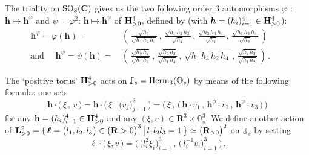 \documentclass[11pt]{amsart}
\newcommand{\sk}{\smallskip}
\begin{document}
The triality on  ${\rm SO}_8(\mathbf C)$ gives us the two following order 3 automorphisms 
  $\varphi $ : $\boldsymbol{h}\mapsto \boldsymbol{h}^\varphi $ 
and $\psi=\varphi^2$: $\boldsymbol{h}\mapsto \boldsymbol{h}^\psi $
of ${\bf H}^4_{>0}$, defined by  (with $\boldsymbol{h}=(h_i)_{i=1}^4 \in {\bf H}^4_{>0}$): 
\begin{align*}
\boldsymbol{h}^\varphi=\varphi(\boldsymbol{h})=  & \, 
\left(\,
\frac{\sqrt{h_{3}}}{\sqrt{h_{1}\,h_{2}\,h_{4}}}
\, , \,  
\frac{\sqrt{h_{1}\,h_{2}\,h_{3}}}{\sqrt{h_{4}}}
\, , \,  
\frac{\sqrt{h_{2}\,h_{3}\,h_{4}}}{\sqrt{h_{1}}}
\, , \,  
\frac{\sqrt{h_{1}\,h_{3}\,h_{4}}}{\sqrt{h_{2}}}
\, 
\right)\qquad \\
\mbox{and }\quad 
\boldsymbol{h}^\psi=\psi(\boldsymbol{h}) = &\,  
\left(\, \frac{\sqrt{h_{2}\,h_{4}}}{\sqrt{h_{1}\,h_{3}}}
\, , \,  
 \frac{\sqrt{h_{2}\, h_{3}}}{\sqrt{h_{1}\, h_{4}}}
 \, , \,  
\sqrt{h_{1}\, h_{3}\, h_{2}\, h_{4}}
\, , \,  
\frac{\sqrt{h_{4}\, h_{3}}}{\sqrt{h_{1}\, h_{2}}}\, \right)\, . 
\end{align*}
\sk


The `positive torus' ${\bf H}^4_{>0}$ acts on $\mathbb J_s= {\rm Herm}_3(\mathbb O_s)$ by means of the following formula:  one sets 
\begin{equation}%
\label{Eq:H4-action}
\boldsymbol{h}\cdot \big(\, \xi\, ,\, v\,\big)= 
\boldsymbol{h}\cdot \Big(\, 
\xi\, , \, 
\big(v_j\big)_{j=1}^3\,
\Big)= \Big(\, 
\xi\, , \, 
\big(\, \boldsymbol{h}\cdot v_1\, , \, 
\boldsymbol{h}^\phi\cdot v_2
\, , \, 
\boldsymbol{h}^\psi\cdot v_3\, 
\big)\,
\Big)
\end{equation}%
for any ${\bf h}=(h_i)_{i=1}^4\in {\bf H}^4_{>0}$
and any $(\xi,v)\in \mathbf R^3\times \mathbb O_s^3$. 
We define another action of  ${\bf L}^2_{>0}= \{ \, \boldsymbol{\ell}=\big(l_1,l_2,l_3\big)\in \big( \mathbf R>0\big)^3 \, \big\lvert \,  l_1l_2l_3=1\, 
\big\}\simeq \big( \mathbf R_{>0}\big)^2$ on  $\mathbb J_s$ by setting 
\begin{equation}%
\label{Eq:L2-action}
\boldsymbol{\ell}\cdot \big(\, \xi,v\,\big)= 
\Big(\, 
\big(l_i^2 \xi_i\big)_{i=1}^3  \, , \, 
\big(\, l_i^{-1} v_i\big)_{i=1}^3\,
\Big)\,.
\end{equation}%
\end{document}
